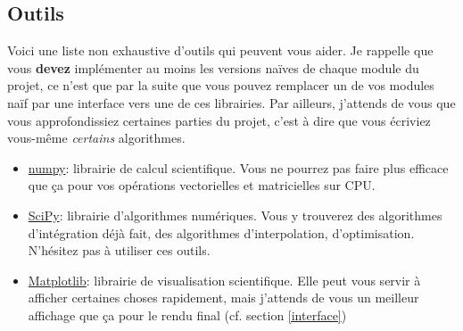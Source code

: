 \documentclass{article}
\begin{document}
\subsection{Outils}
\label{outils}

Voici une liste non exhaustive d'outils qui peuvent vous aider. Je rappelle que vous \textbf{devez} implémenter au moins les versions naïves de chaque module du projet, ce n'est que par la suite que vous pouvez remplacer un de vos modules naïf par une interface vers une de ces librairies. Par ailleurs, j'attends de vous que vous approfondissiez certaines parties du projet, c'est à dire que vous écriviez vous-même \emph{certains} algorithmes.
\begin{itemize}
    \item \href{https://numpy.org/}{numpy}: librairie de calcul scientifique. Vous ne pourrez pas faire plus efficace que ça pour vos opérations vectorielles et matricielles sur CPU.
    \item \href{https://docs.scipy.org/doc/scipy/reference/}{SciPy}: librairie d'algorithmes numériques. Vous y trouverez des algorithmes d'intégration déjà fait, des algorithmes d'interpolation, d'optimisation. N'hésitez pas à utiliser ces outils.
    \item \href{https://matplotlib.org/}{Matplotlib}: librairie de visualisation scientifique. Elle peut vous servir à afficher certaines choses rapidement, mais j'attends de vous un meilleur affichage que ça pour le rendu final (cf. section \ref{interface})
\end{itemize}
\end{document}
